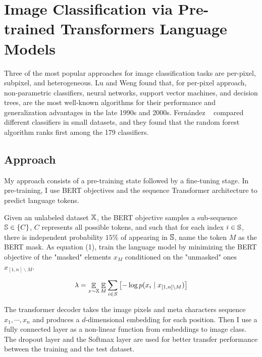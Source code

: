 \documentclass[review]{cvpr}
\begin{document}
\section{Image Classification via Pre-trained Transformers Language Models}

Three of the most popular approaches for image classification tasks are per-pixel, subpixel, and heterogeneous.
Lu and Weng found that, for per-pixel approach, non-parametric classifiers, \eg neural networks, support vector machines, and decision trees,
are the most well-known algorithms for their performance and generalization advantages in the late 1990s and 2000s.
Fern{\'a}ndez \etal~\cite{fernandez2014we} compared different classifiers in small datasets, and they found that the random forest algorithm ranks first among the 179 classifiers.

\subsection{Approach}

My approach consists of a pre-training state followed by a fine-tuning stage.
In pre-training, I use BERT objectives and the sequence Transformer architecture to predict language tokens.

\par Given an unlabeled dataset $\Bbb X$, the BERT objective samples a sub-sequence $\Bbb S \in \{C\}$,
$C$ represents all possible tokens, and such that for each index $i \in \Bbb S$,
there is independent probability $15\%$ of appearing in $\Bbb S$,
name the token $M$ as the BERT mask.
As equation (1), train the language model by minimizing the BERT objective of the "masked" elements $x_M$
conditioned on the "unmasked" ones $x_{\left[1,n\right]\backslash M}$.

\begin{equation}
  \lambda = \mathop{\Bbb E}\limits_{x\sim\Bbb X} \mathop{\Bbb E}\limits_{M} \sum_{i\in S}{\bigl[-\log{p(x_i\mid x_{\left[1,n \right]\backslash M})\bigr]}}
\end{equation}

\par The transformer decoder takes the image pixels and meta characters sequence $x_1,\cdots,x_n$ and produces a $d$-dimensional
embedding for each position.
Then I use a fully connected layer as a non-linear function from embeddings to image class.
The dropout layer and the Softmax layer are used for better transfer performance between the training and the test dataset.
\end{document}
